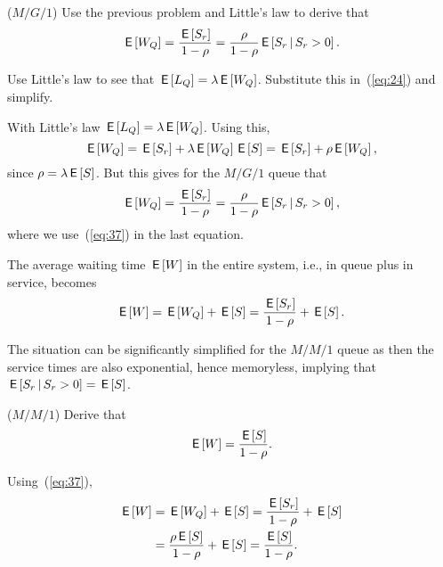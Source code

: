 \begin{exercise}($M/G/1$)
  Use the previous problem and Little's law to derive that 
\begin{equation}\label{eq:35}
  \E{W_Q} = \frac{\E{S_r}}{1-\rho} = \frac{\rho}{1-\rho} \E{S_r\given S_r>0}.
\end{equation}
\begin{hint}
Use Little's law to see that $\E{L_Q} = \lambda \E{W_Q}$. Substitute this in~(\ref{eq:24}) and simplify.
\end{hint}
\begin{solution}
With  Little's law $\E{L_Q} = \lambda \E{W_Q}$. Using this,
\begin{equation*}
  \E{W_Q} = \E{S_r} + \lambda \E{W_Q} \E S  =\E{S_r} + \rho \E{W_Q},
\end{equation*}
since $\rho=\lambda \E S$. But this gives for the $M/G/1$ queue that
\begin{equation*}
  \E{W_Q} = \frac{\E{S_r}}{1-\rho} = \frac{\rho}{1-\rho} \E{S_r\given S_r>0},
\end{equation*}
where we use~(\ref{eq:37}) in the last equation.
\end{solution}
\end{exercise}

The average waiting time $\E W$ in the entire system, i.e., in queue
plus in service, becomes
\begin{equation*}
  \E W = \E{W_Q}+ \E S = \frac{\E{S_r}}{1-\rho} + \E S.
\end{equation*}

The situation can be significantly simplified for the $M/M/1$ queue as
then the service times are also exponential, hence memoryless,
implying that $\E{S_r\given S_r>0} = \E S$. 

\begin{exercise}($M/M/1$) Derive that
\begin{equation}\label{eq:ew}
  \E W = \frac{\E S}{1-\rho}.
\end{equation}
\begin{solution}
Using~(\ref{eq:37}),
\begin{equation*}
  \begin{split}
  \E W 
&= \E{W_Q}+ \E S = 
\frac{\E{S_r}}{1-\rho} + \E S \\
&= \frac{\rho \E S}{1-\rho} + \E S = \frac{\E S}{1-\rho}.
  \end{split}
\end{equation*}
\end{solution}
\end{exercise}

